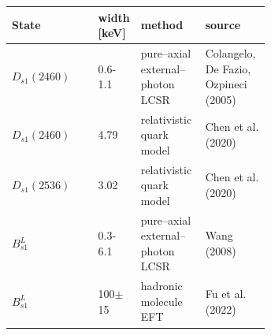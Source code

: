 \begin{tabular}{lp{0.15\linewidth}p{0.25\linewidth}p{0.25\linewidth}}
\toprule
State & width [keV] & method & source\\
\midrule
$D_{s1}(2460)$ & 0.6-1.1 & pure--axial external--photon LCSR & Colangelo, De Fazio, Ozpineci (2005)\\
$D_{s1}(2460)$ & 4.79 & relativistic quark model & Chen et al. (2020)\\
$D_{s1}(2536)$ & 3.02 & relativistic quark model & Chen et al. (2020)\\
$B_{s1}^{L}$ & 0.3-6.1 & pure--axial external--photon LCSR & Wang (2008)\\
$B_{s1}^{L}$ & 100$\pm$15 & hadronic molecule EFT & Fu et al. (2022)\\
\bottomrule
\end{tabular}

